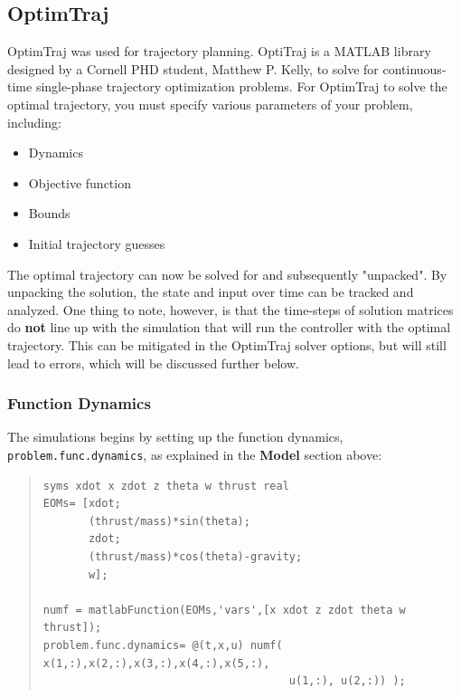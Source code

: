 \documentclass[12pt]{article}
\begin{document}
\subsection{OptimTraj}

OptimTraj \cite{OptimTraj} was used for trajectory planning. OptiTraj is a MATLAB library designed by a Cornell PHD student, Matthew P. Kelly, to solve for continuous-time single-phase trajectory optimization problems. For OptimTraj to solve the optimal trajectory, you must specify various parameters of your problem, including:
\begin{itemize}
  \item Dynamics
  \item Objective function
  \item Bounds
  \item Initial trajectory guesses
\end{itemize}

The optimal trajectory can now be solved for and subsequently "unpacked". By unpacking the solution, the state and input over time can be tracked and analyzed. One thing to note, however, is that the time-steps of solution matrices do \textbf{not} line up with the simulation that will run the controller with the optimal trajectory. This can be mitigated in the OptimTraj solver options, but will still lead to errors, which will be discussed further below. 
\subsubsection{Function Dynamics}
The simulations begins by setting up the function dynamics, \lstinline!problem.func.dynamics!, as explained in the \textbf{Model} section above: 
\begin{quote}
\begin{lstlisting}
syms xdot x zdot z theta w thrust real
EOMs= [xdot;
       (thrust/mass)*sin(theta);
       zdot;
       (thrust/mass)*cos(theta)-gravity;
       w];

numf = matlabFunction(EOMs,'vars',[x xdot z zdot theta w thrust]);
problem.func.dynamics= @(t,x,u) numf( x(1,:),x(2,:),x(3,:),x(4,:),x(5,:),
                                      u(1,:), u(2,:)) );

\end{lstlisting}
\end{quote}
\end{document}

